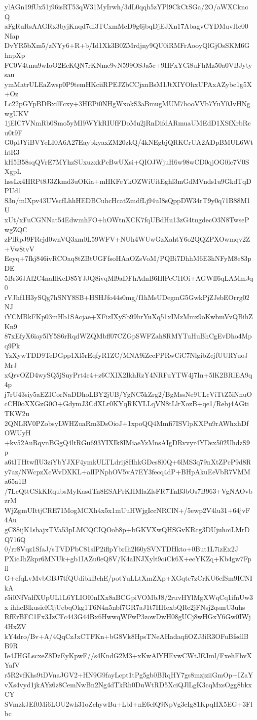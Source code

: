 ylAGn19fUx51j96isRT53qW31MyIrwh/3dL0qqh5zYPl9CkCtSGa/2O/aWXCknoQ
aFgRuRsAAGRx3byjKnqd7dl3TCxmMcD9g6jbqDjEJXn17AbagvCYDMuvHe00NIap
DvYR5bXm5/zNYy6+R+b/Id1Xk3B0ZMrdjny9QU0iRMFrAooyQlGjOsSKM6GhnpXp
FC0V4tmu9wIoO2EeKQN7rKNme9vN599OSJa5c+9HFxYCi8uFhMz50a0VBJytysau
ymMatrULEaZwsp0P9temHKciiRPEJZbCCjxnBsM1JtXIYOhxUPAxAZybc1g5X+Oz
Lc22pGYpBDBxilFcxy+3HEPi0NHgWxokS3aBmugMUM7hooVVb7YuY0JvHNgwgUKV
1jElC7VNmRb0Smo5yMI9WYkRIUfFDoMu2jRnDifdARmuaUMEdD1XSfXrbRcu0t9F
G0plJYiBVYeLI0A6A27EaybkyaxZM20zkQ/4kNEgbjQRKCrUA2ADpBMUL6WthtR3
kH5B58sqQVrE7MYhzSUxuzxkPcBwUXsi+QIOJWjuH6w98wCD0qjOG0lc7V0SXgpL
hssLx4HRPt8J3Zkmd3uOKia+mHKFeYkOZWiUitEghl3mGdMVnds1u9GkdTqDPUd1
S3n/mlXpv43UVscfLhhHEDBCuhcHcatZmdfLj94uI8sQppDW34rT9y0q71B88M1U
xUt/xFuCGNNat54EdwmhFO+hOWtnXCK7fqUBdHu13zG4tugdecO3N8TwsePwgZQC
zPlRpJ9FRcjd0wnVQ3xm0L59WFV+NUh4WUwGzXahtY6o2QQZPXOwmqv2Z+Vw8tvV
Eeyq+7fkj846ivRCOaq8tZBtUGFfsoHAaOZsVoM/PQBi7DhhM6E3hNFyM8e83pDE
5Br36JAl2C4naIlKcD85YJJQ8ivqMl9aDFhAdnB6HlPeC1IOi+AGWff6qLAMmJq0
rVJhf1H3ySQg7hSNY8SB+HSHJfo44s0mg/f1hMsUDegmG5GwkPjZJsbEOrrg02NJ
iYCMBkFKp03mHb1SAcjae+XFizIXySb99hrYuXq51xIMzMmz9oKwbmVvQBihZKn9
87xEfyX6iay5lY5S6rRqdWZQMbff07CZGpSWFZah8RMYTuHuBhCgEvDho4Mpq9Pk
YzXywTDD9TeDGpp1Xl5rEqfyR1ZC/MNA9iZcePPRwCiC7NlgibZejfUURYuoJMrJ
xQrvOZD4wySQ5jSuyPrt4c4+z6CXIX2IkhRzY4NRFuYTW4j7In+5lK2BRlEA9q4p
j7rU43siy5aEZICorNaDDhoLBY2jUB/YgNC5kZrg2/BgMssNe9ULcViTtZ5iNnuO
cCH0oXXGzG0O+GdymJ3CdXLr0KYqRKYLLqVN8tLlrXozB+qe1/Rebj4AGtiTKW2u
2QNLRV0PZobsyLWHZuaRm3DsOioJ+1xpoQQ4Mmfi7ISVlpKXPu9rAWhxhDfOWUyH
+kv52AuRqvnBGgQ4ltRGu693YIXIk8IMiaeYzMnsAIgDRvvyr4YDsx502UhdzS9p
a6tITHtwfIU3ziYbYJXF4ymkULTLdrij8HhkGDes8l0Q+6lMS3q79nXtZPcP9d8R
y7az/NWcpzXcWvDXKL+alIPNphOV5vA7EY3fecq4dP+BHpAkuEeVbR7VMMa65a1B
/7LeQttCSkKRqubsMyKasdTn8ESAPrKHMlaZlsFR7TnB3bOs7B963+VgNAOvbzrM
WjZgmUIttjCRE71MogMCXh4x5x1mUuHWjgIccNRClN+/5ewp2V4lu31+64jvF4Au
gC88ijK1sbajxTVa53pLMCQCIQOob8p+bGKVXwQHSGvKRcg3DUjuhoiLMrDQ716Q
0/rr8Vqz1SfaJ/sTVDPbC81slP2iflpYbrIh2l60ySVNTDHkto+0But1L7izEx2J
PXicJhZkpr6MNUk+gb1IAZu0eQ8V/K4aINJXylt9oiCk6X+ecYKZq+Kb4gw7Fpfl
G+cfqLvMvbGBJ7tfQUdibkBchE/potYuLLtXmZXp+XGqtc7zCrKU6efSm9ICNIkA
r5i0NfValfXUpUL1L6YLIOI0nIXx8aBCGpiVOMbJ8/2ruvHYlMgXWqCq1ifnUw3x
ihhcBlkusielCljUebqOkg1T6N4n5nbf7GR7aJ1t7HHexbQRe2jFNsj2qsmU3uhs
RfErBFC1Fx3JzCFc443G44Bx6HwwqWFwP3zowDwH08gUCj8wHGxY6Gw0IWj4HxZV
kY4dro/Bv+A/4QqCzJxCTFKn+bG8Vk8HpsTNeAHadaqfiOZJ3iR3OFuBfsdlBB9R
Ie4JHGLscxeZ8DzEyKpwF//s4KndG2M3+xKwAlYHEvwCWtJEJml/FxehFbvXYafV
r5R2vfKhs9tDVnaJGV2+HN9G9fayLcpt1tPg5gb0BRqHY7gs8mzjziiGmOp+IZaY
vXs4vyd1jkAYz6z8CemNwBn2Ng4dTkRh0DuWtRD5XciQJlLgK3cqMxsOgg8bkxCY
SVmzkJEf0Mi6LOU2wh31oZchywBu+LbI+nE6clQ9NpVg3eIg81KpqHX5EG+3Flbc
